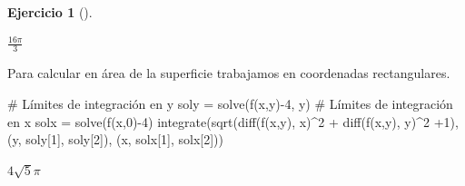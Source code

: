 \documentclass[
  a4paper,
]{scrreport}
\newenvironment{Shaded}{\begin{snugshade}}{\end{snugshade}}
\newcommand{\CommentTok}[1]{\textcolor[rgb]{0.37,0.37,0.37}{#1}}
\newcommand{\FloatTok}[1]{\textcolor[rgb]{0.68,0.00,0.00}{#1}}
\newcommand{\FunctionTok}[1]{\textcolor[rgb]{0.28,0.35,0.67}{#1}}
\newcommand{\NormalTok}[1]{\textcolor[rgb]{0.00,0.23,0.31}{#1}}
\newcommand{\OperatorTok}[1]{\textcolor[rgb]{0.37,0.37,0.37}{#1}}
\theoremstyle{definition}
\newtheorem{exercise}{Ejercicio}[chapter]
\theoremstyle{remark}
\begin{document}
\begin{exercise}[]
\begin{tcolorbox}
$\frac{16 \pi}{3}$

Para calcular en área de la superficie trabajamos en coordenadas
rectangulares.

\begin{Shaded}
\begin{Highlighting}[]
\CommentTok{\# Límites de integración en y}
\NormalTok{soly }\OperatorTok{=} \FunctionTok{solve}\NormalTok{(}\FunctionTok{f}\NormalTok{(x,y)}\OperatorTok{{-}}\FloatTok{4}\NormalTok{, y)}
\CommentTok{\# Límites de integración en x}
\NormalTok{solx }\OperatorTok{=} \FunctionTok{solve}\NormalTok{(}\FunctionTok{f}\NormalTok{(x,}\FloatTok{0}\NormalTok{)}\OperatorTok{{-}}\FloatTok{4}\NormalTok{)}
\FunctionTok{integrate}\NormalTok{(}\FunctionTok{sqrt}\NormalTok{(}\FunctionTok{diff}\NormalTok{(}\FunctionTok{f}\NormalTok{(x,y), x)}\OperatorTok{\^{}}\FloatTok{2} \OperatorTok{+} \FunctionTok{diff}\NormalTok{(}\FunctionTok{f}\NormalTok{(x,y), y)}\OperatorTok{\^{}}\FloatTok{2} \OperatorTok{+}\FloatTok{1}\NormalTok{), (y, soly[}\FloatTok{1}\NormalTok{], soly[}\FloatTok{2}\NormalTok{]), (x, solx[}\FloatTok{1}\NormalTok{], solx[}\FloatTok{2}\NormalTok{]))}
\end{Highlighting}
\end{Shaded}

$4 \sqrt{5} \pi$

\end{tcolorbox}

\end{exercise}
\end{document}
